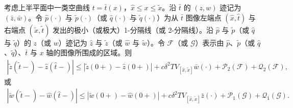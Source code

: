 \documentclass[../../main.tex]{subfiles}
\begin{document}
\begin{lemma}\label{lemma:ch12-迹差估计}
考虑上半平面中一类空曲线 $t=\bar t(x)$，$\hat x\leqslant x\leqslant\tilde x$。沿 $\bar t$ 的 $(z,w)$ 迹记为 $(\bar z,\bar w)$。令 $\hat p(\cdot)$ 与 $\tilde p(\cdot)$（或 $\hat q(\cdot)$ 与 $\tilde q(\cdot)$）为从 $\bar t$ 图像左端点 $(\hat x,\hat t)$ 与右端点 $(\tilde x,\tilde t)$ 发出的极小（或极大）1-分隔线（或 2-分隔线）。沿 $\hat p$ 与 $\tilde p$（或 $\hat q$ 与 $\tilde q$）的 $z$（或 $w$）迹记为 $\hat z$ 与 $\tilde z$（或 $\hat w$ 与 $\tilde w$）。令 $\mathscr{F}$（或 $\mathscr{G}$）表示由 $\hat p$、$\tilde p$（或 $\hat q$、$\tilde q$）、$\bar t$ 与 $x$ 轴的图像所围成的区域。则
\begin{align}
|\tilde z(\tilde t-)-\hat z(\hat t-)|\leqslant|\tilde z(0+)-\hat z(0+)|+c\delta^2TV_{[\hat x,\tilde x]}\bar w(\cdot)+\mathscr{P}_2(\mathscr{F})+\mathscr{Q}_2(\mathscr{F}),
\label{align:ch12-迹差1}
\end{align}
或
\begin{align}
|\tilde w(\tilde t-)-\hat w(\hat t-)|\leqslant|\tilde w(0+)-\hat w(0+)|+c\delta^2TV_{[\hat x,\tilde x]}\bar z(\cdot)+\mathscr{P}_1(\mathscr{G})+\mathscr{Q}_1(\mathscr{G}).
\label{align:ch12-迹差2}
\end{align}
\end{lemma}
\end{document}
